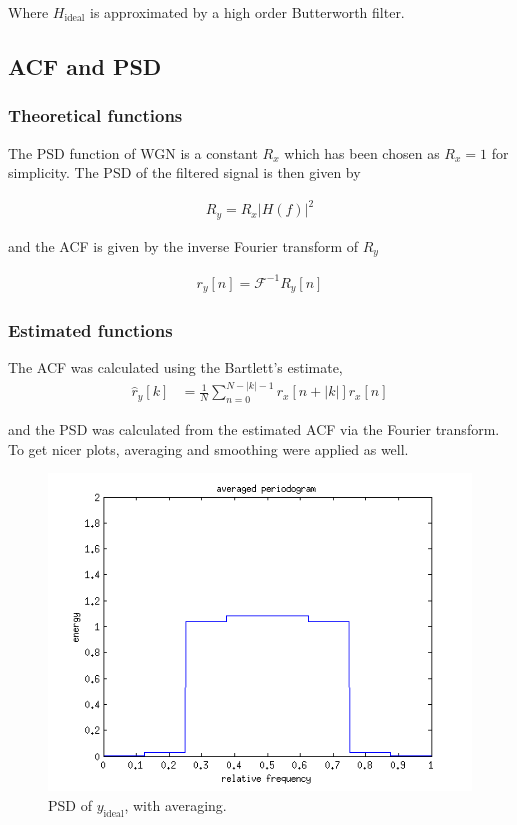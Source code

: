 \documentclass[10pt]{article}
\begin{document}
Where $H_\text{ideal}$ is approximated by a high order Butterworth filter.

\subsection{ACF and PSD}
\subsubsection{Theoretical functions}
The PSD function of WGN is a constant $R_x$ which has been chosen as $R_x = 1$ for simplicity. The PSD of the filtered signal is then given by

\begin{align*}
R_y = R_x|H(f)|^2
\end{align*}

and the ACF is given by the inverse Fourier transform of $R_y$

\begin{align*}
r_y[n] = \mathcal{F}^{-1}{R_y}[n]
\end{align*}

\subsubsection{Estimated functions}
The ACF was calculated using the Bartlett's estimate,
\begin{align*}
\hat{r}_y[k] &=  \frac{1}{N}\sum_{n=0}^{N-|k|-1}r_x[n+|k|]r_x[n]
\end{align*}

and the PSD was calculated from the estimated ACF via the Fourier transform.
To get nicer plots, averaging and smoothing were applied as well.

\begin{figure}[!hp]

    \begin{center}
      \includegraphics[width=1\textwidth]{ideal_periodogram_average}
    \caption{PSD of $y_\text{ideal}$, with averaging. \label{fig:TheoACFsimple}}
    \end{center}

\end{figure}
\end{document}
